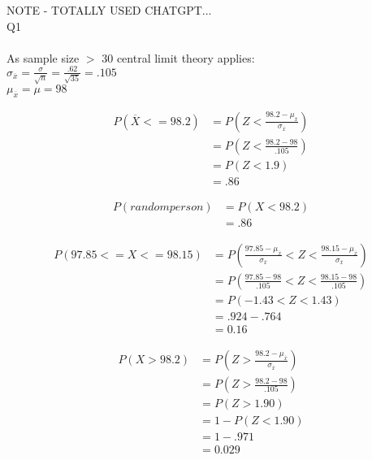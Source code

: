 \documentclass{article}
\begin{document}
NOTE - TOTALLY USED CHATGPT...\\

Q1\\\\
As sample size $>$ 30 central limit theory applies: \\
$\sigma_{\overline{x}} = \frac{\sigma}{\sqrt{n}} = \frac{.62}{\sqrt{35}} = .105$ \\
$\mu_{\overline{x}} = \mu = 98$

\begin{equation*}
\begin{split}
P(\overline{X} <= 98.2) & = P(Z < \frac{98.2 - \mu_{\overline{x}}}{\sigma_{\overline{x}}}) \\
& = P(Z < \frac{98.2 - 98}{.105})\\
& = P(Z < 1.9)\\
& = .86
\end{split}
\end{equation*}

\begin{equation*}
\begin{split}
P(random person) &= P( X< 98.2)\\
& = .86
\end{split}
\end{equation*}

\begin{equation*}
\begin{split}
P(97.85 <= X <= 98.15) & = P(\frac{97.85 - \mu_{\overline{x}}}{\sigma_{\overline{x}}} < Z < \frac{98.15 - \mu_{\overline{x}}}{\sigma_{\overline{x}}})\\
& = P(\frac{97.85 - 98}{.105} < Z < \frac{98.15 - 98}{.105})\\
& = P(-1.43 < Z < 1.43)\\
& = .924 - .764\\
& = 0.16
\end{split}
\end{equation*}

\begin{equation*}
\begin{split}
P(X > 98.2 ) & = P(Z > \frac{98.2 - \mu_{\overline{x}}}{\sigma_{\overline{x}}})\\
& = P(Z > \frac{98.2 - 98}{.105})\\
& = P(Z > 1.90)\\
& = 1 - P(Z < 1.90)\\
& = 1 - .971\\
& = 0.029
\end{split}
\end{equation*}
\end{document}
